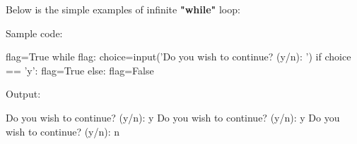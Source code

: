 \setlength{\columnsep}{3pt}


\begin{flushleft}

	
	Below is the simple examples of infinite \textbf{"while"} loop:

	\newline

	
	Sample code:

	\begin{tcolorbox}[breakable,notitle,boxrule=-0pt,colback=code,colframe=code]

		\color{white}

		\font=8pt

		flag=True \newline
		while flag:  \newline
		\hphantom{} \hphantom{} choice=input('Do you wish to continue? (y/n): ') \newline
		\hphantom{} \hphantom{} if choice == 'y':  \newline
		\hphantom{} \hphantom{} \hphantom{} \hphantom{} flag=True  \newline
		\hphantom{} \hphantom{} else:  \newline
		\hphantom{} \hphantom{} \hphantom{} \hphantom{} flag=False

		\font=4pt

	\end{tcolorbox}

	
	Output:

	\begin{tcolorbox}[breakable,notitle,boxrule=-0pt,colback=output,colframe=output]

		\color{black}

		Do you wish to continue? (y/n): y \newline
		Do you wish to continue? (y/n): y \newline
		Do you wish to continue? (y/n): n

		\font=4pt

	\end{tcolorbox}

	
	
\end{flushleft}



\newpage



